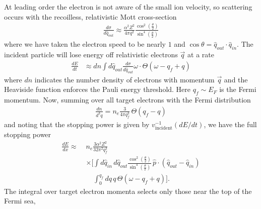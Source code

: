 \documentclass[twocolumn, preprintnumbers,amsmath,amssymb,prd, superscriptaddress]{revtex4}
\begin{document}
\begin{appendices}
At leading order the electron is not aware of the small ion velocity, so scattering occurs with the recoilless, relativistic Mott cross-section
\begin{align}
    \frac{d\sigma}{d\hat{q}_{out}} \approx \frac{\alpha^2 Z^2}{4\pi q^2}
    \frac{\cos^2\left(\frac{\theta}{2}\right)}
    {\sin^4\left(\frac{\theta}{2}\right)}
\end{align}
where we have taken the electron speed to be nearly $1$ and $\cos\theta = \hat{q}_{out} \cdot \hat{q}_{in}$.
The incident particle will lose energy off relativistic electrons $\vec{q}$ at a rate
\begin{align}
  \frac{dE}{dt} &\approx dn \int d{\hat{q}_{out}}
    \frac{d\sigma}{d\hat{q}_{out}} \omega \cdot
    \Theta\left(\omega - q_f + q\right)
\end{align}
where $dn$ indicates the number density of electrons with momentum $\vec{q}$ and the Heaviside function enforces the Pauli energy threshold.
Here $q_f \sim E_F$ is the Fermi momentum.
Now, summing over all target electrons with the Fermi distribution
\begin{align}
  \frac{dn}{d^3q} = n_e \frac{3}{4\pi q_f^3} \, \Theta(q_f - q)
\end{align}
and noting that the stopping power is given by $v_\text{incident}^{-1} (dE/dt)$, we have the full stopping power
\begin{align}
  \label{eq:StoppingPowerIntegral}
  \frac{dE}{dx} \approx \; &n_e \frac{3 \alpha^2 Z^2}{32 \pi^2 q_f^3}
   \nonumber\\
  &  \times \Bigg[ \int d\hat{q}_{in} \, d\hat{q}_{out}
   \frac{\cos^2\left(\frac{\theta}{2}\right)}
        {\sin^4\left(\frac{\theta}{2}\right)}
   \, \hat{p} \cdot \left(\hat{q}_{out} - \hat{q}_{in}\right) \nonumber \\
  &\phantom{ \times \Bigg[ }\int_0^{q_f} dq \, q \, \Theta\left(\omega - q_f + q\right)
     \Bigg] .
\end{align}
The integral over target electron momenta selects only those near the top of the Fermi sea,

\end{appendices}
\end{document}

